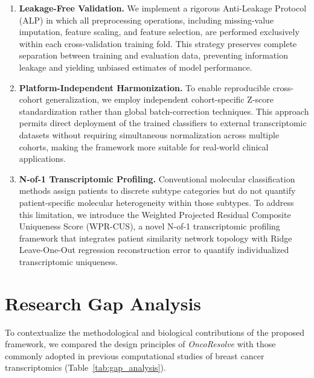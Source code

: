\documentclass[10pt,a4paper,twocolumn]{article}
\begin{document}
\begin{enumerate}
\item \textbf{Leakage-Free Validation.}
We implement a rigorous Anti-Leakage Protocol (ALP) in which all preprocessing operations, including missing-value imputation, feature scaling, and feature selection, are performed exclusively within each cross-validation training fold. This strategy preserves complete separation between training and evaluation data, preventing information leakage and yielding unbiased estimates of model performance.

\item \textbf{Platform-Independent Harmonization.}
To enable reproducible cross-cohort generalization, we employ independent cohort-specific Z-score standardization rather than global batch-correction techniques. This approach permits direct deployment of the trained classifiers to external transcriptomic datasets without requiring simultaneous normalization across multiple cohorts, making the framework more suitable for real-world clinical applications.

\item \textbf{N-of-1 Transcriptomic Profiling.}
Conventional molecular classification methods assign patients to discrete subtype categories but do not quantify patient-specific molecular heterogeneity within those subtypes. To address this limitation, we introduce the Weighted Projected Residual Composite Uniqueness Score (WPR-CUS), a novel N-of-1 transcriptomic profiling framework that integrates patient similarity network topology with Ridge Leave-One-Out regression reconstruction error to quantify individualized transcriptomic uniqueness.
\end{enumerate}

\section{Research Gap Analysis}

To contextualize the methodological and biological contributions of the proposed framework, we compared the design principles of \textit{OncoResolve} with those commonly adopted in previous computational studies of breast cancer transcriptomics (Table~\ref{tab:gap_analysis}).
\end{document}
